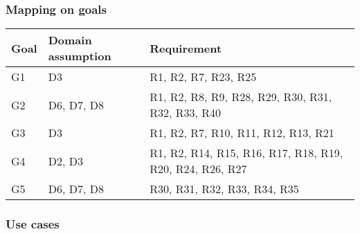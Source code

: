\documentclass[11pt]{article}
\begin{document}
\subsubsection{Mapping on goals}

\begin{table}[H]
    \centering
    \setlength{\tabcolsep}{18pt}
    \renewcommand{\arraystretch}{1.2}
    \begin{tabularx}{\textwidth}{|>{\hsize=0.4\hsize}X|>{\hsize=1\hsize}X|>{\hsize=1.6\hsize}X|}
        \hline
        \textbf{Goal} & \textbf{Domain assumption} & \textbf{Requirement} \\
        \hline
        G1 & D3 & R1, R2, R7, R23, R25 \\ %
        \hline
        G2 & D6, D7, D8 & R1, R2, R8, R9, R28, R29, R30, R31, R32, R33, R40 \\ %
        \hline
        G3 & D3 & R1, R2, R7, R10, R11, R12, R13, R21 \\ %
        \hline
        G4 & D2, D3 & R1, R2, R14, R15, R16, R17, R18, R19, R20, R24, R26, R27 \\ %
        \hline
        G5 & D6, D7, D8 & R30, R31, R32, R33, R34, R35 \\ %
        \hline
    \end{tabularx}
    \label{tab:requirementsMapping}
\end{table}

\subsubsection{Use cases}
\end{document}
